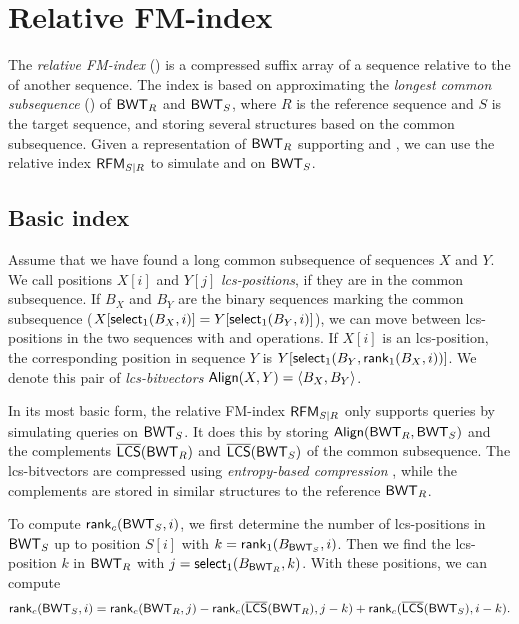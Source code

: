 \section{Relative FM-index}

The \emph{relative FM-index} (\RFM) \cite{Belazzougui2014} is a compressed
suffix array of a sequence relative to the \CSA{} of another sequence.
The index is based on approximating the
\emph{longest common subsequence} (\LCS) of $\mathsf{BWT}_{R}$ and $\mathsf{BWT}_{S}$,
where $R$ is the reference sequence and $S$ is the target sequence, and
storing several structures based on the common subsequence. Given a
representation of $\mathsf{BWT}_{R}$ supporting \rank{} and \select{}, we can use the
relative index $\mathsf{RFM}_{S \mid R}$ to simulate \rank{} and \select{} on
$\mathsf{BWT}_{S}$.

\subsection{Basic index}

Assume that we have found a long common subsequence of sequences $X$ and $Y$.
We call positions $X[i]$ and $Y[j]$ \emph{lcs-positions}, if they are in the
common subsequence. If $B_{X}$ and $B_{Y}$ are the binary sequences marking
the common subsequence ($X[\textsf{select}_1(B_{X},i)] = Y[\textsf{select}_1(B_{Y},i)]$), we
can move between lcs-positions in the two sequences with \rank{} and \select{}
operations. If $X[i]$ is an lcs-position, the corresponding position in
sequence $Y$ is $Y[\mathsf{select}_{1}(B_{Y}, \mathsf{rank}_{1}(B_{X}, i))]$. We denote this
pair of \emph{lcs-bitvectors} $\mathsf{Align}(X,Y) = \langle B_X,B_Y \rangle$.

In its most basic form, the relative FM-index $\mathsf{RFM}_{S \mid R}$ only supports
\find{} queries by simulating \rank{} queries on $\mathsf{BWT}_{S}$. It does this by
storing $\mathsf{Align}(\textsf{BWT}_{R},\textsf{BWT}_{S})$ and the complements $\overline{ \mathsf{LCS} }(\mathsf{BWT}_{R})$ and
$\overline{ \mathsf{LCS} }(\mathsf{BWT}_{S})$ of the common subsequence. The lcs-bitvectors are compressed
using \emph{entropy-based compression} \cite{Raman2007}, while the complements
are stored in similar structures to the reference $\mathsf{BWT}_{R}$.

To compute $\mathsf{rank}_{c}(\mathsf{BWT}_{S}, i)$, we first determine the number of
lcs-positions in $\mathsf{BWT}_{S}$ up to position $S[i]$ with $k =
\mathsf{rank}_{1}(B_{\mathsf{BWT}_{S}}, i)$. Then we find the lcs-position $k$ in $\mathsf{BWT}_{R}$
with $j = \mathsf{select}_{1}(B_{\mathsf{BWT}_{R}}, k)$. With these positions, we can compute
$$
\mathsf{rank}_{c}(\mathsf{BWT}_{S}, i) = \mathsf{rank}_{c}(\mathsf{BWT}_{R}, j) - \mathsf{rank}_{c}(\overline{ \mathsf{LCS} }(\mathsf{BWT}_{R}),
j-k) + \mathsf{rank}_{c}(\overline{ \mathsf{LCS} }(\mathsf{BWT}_{S}), i-k).
$$

